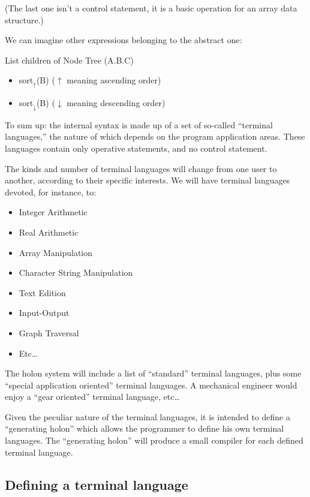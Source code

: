 \documentclass[openany,nobib]{tufte-book}
\begin{document}
\noindent (The last one isn't a control statement, it is a basic operation for
an array data structure.)

\medskip

\noindent We can imagine other expressions belonging to the abstract one:

\medskip

List children of Node Tree (A.B.C)
\begin{itemize}
    \item[] sort$_\uparrow$(B) \quad ($\uparrow$ meaning ascending order)
    \item[] sort$_\downarrow$(B) \quad ($\downarrow$ meaning descending order)
\end{itemize}

To sum up: the internal syntax is made up of a set of so-called ``terminal
languages,'' the nature of which depends on the program application areas.
These languages contain only operative statements, and no control statement.

The kinds and number of terminal languages will change from one user to
another, according to their specific interests. We will have terminal languages
devoted, for instance, to:
\begin{itemize}
    \item Integer Arithmetic
    \item Real Arithmetic
    \item Array Manipulation
    \item Character String Manipulation
    \item Text Edition
    \item Input-Output
    \item Graph Traversal
    \item Etc\dots
\end{itemize}

The holon system will include a list of ``standard'' terminal languages, plus
some ``special application oriented'' terminal languages. A mechanical engineer
would enjoy a ``gear oriented'' terminal language, etc\dots

Given the peculiar nature of the terminal languages, it is intended to define a
``generating holon'' which allows the programmer to define his own terminal
languages. The ``generating holon'' will produce a small compiler for each
defined terminal language.

\subsection{Defining a terminal language}
\end{document}
